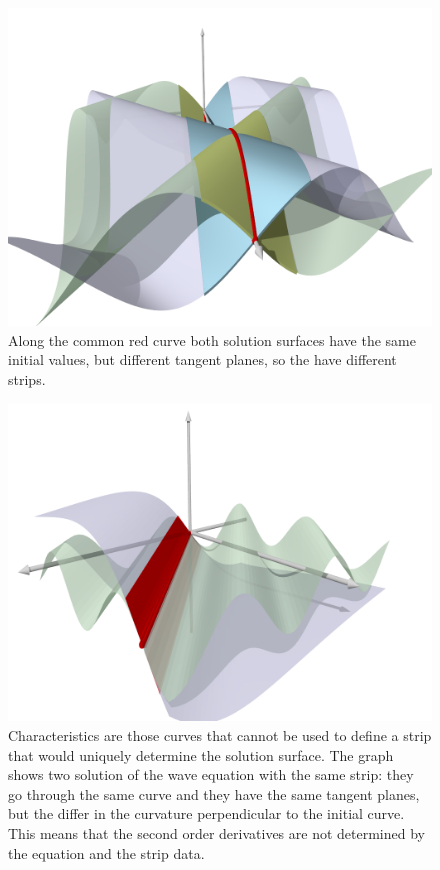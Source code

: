 \begin{figure}
\centering
\includegraphics[width=\hsize]{../common/3d/streifen2.png}
\caption{Along the common red curve both solution surfaces have
the same initial values, but different tangent planes, so the
have different strips.
\label{skript:streifen:eindeutig}}
\end{figure}

\begin{figure}
\centering
\includegraphics[width=\hsize]{../common/3d/streifen1.png}
\caption{Characteristics are those curves that cannot be used to
define a strip that would uniquely determine the solution surface.
The graph shows two solution of the wave equation with the same
strip: they go through the same curve and they have the same
tangent planes, but the differ in the curvature perpendicular to the
initial curve.
This means that the second order derivatives are not determined by
the equation and the strip data.
\label{skript:streifen:zweideutig}}
\end{figure}

